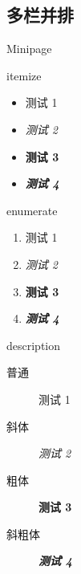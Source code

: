 \subsection{多栏并排}

\begin{frame}{Minipage}


\begin{minipage}{.27\textwidth}
    \begin{block}{}
        \centering itemize
    \end{block}
    \begin{itemize}
        \item 测试 1
        \item \textit{测试 2}
        \item \textbf{测试 3}
        \item \textbf{\textit{测试 4}}
    \end{itemize}
\end{minipage}
\begin{minipage}{.27\textwidth}
    \begin{block}{}
        \centering enumerate
    \end{block}
    \begin{enumerate}
        \item 测试 1
        \item \textit{测试 2}
        \item \textbf{测试 3}
        \item \textbf{\textit{测试 4}}
    \end{enumerate}
\end{minipage}
\begin{minipage}{.35\textwidth}
    \begin{block}{}
        \centering description
    \end{block}
    \begin{description}
        \item[普通] 测试 1
        \item[斜体] \textit{测试 2}
        \item[粗体] \textbf{测试 3}
        \item[斜粗体] \textbf{\textit{测试 4}}
    \end{description}
\end{minipage}
\end{frame}

